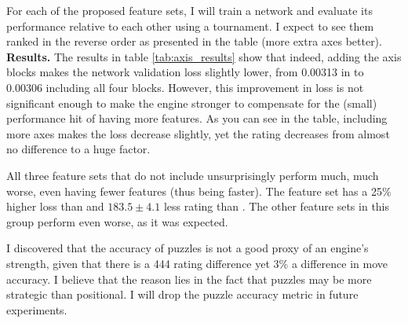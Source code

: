 For each of the proposed feature sets, I will train a network and evaluate its performance relative to each other using a tournament. I expect to see them ranked in the reverse order as presented in the table (more extra axes better). \\

\textbf{Results.} The results in table \ref{tab:axis_results} show that indeed, adding the axis blocks makes the network validation loss slightly lower, from 0.00313 in  to 0.00306 including all four blocks. However, this improvement in loss is not significant enough to make the engine stronger to compensate for the (small) performance hit of having more features. As you can see in the table, including more axes makes the loss decrease slightly, yet the rating decreases from almost no difference to a huge factor.

All three feature sets that do not include  unsurprisingly perform much, much worse, even having fewer features (thus being faster). The feature set  has a 25\% higher loss than  and $183.5 \pm 4.1$ less rating than . The other feature sets in this group perform even worse, as it was expected.

I discovered that the accuracy of puzzles is not a good proxy of an engine's strength, given that there is a 444 rating difference yet 3\% a difference in move accuracy. I believe that the reason lies in the fact that puzzles may be more strategic than positional. I will drop the puzzle accuracy metric in future experiments.

